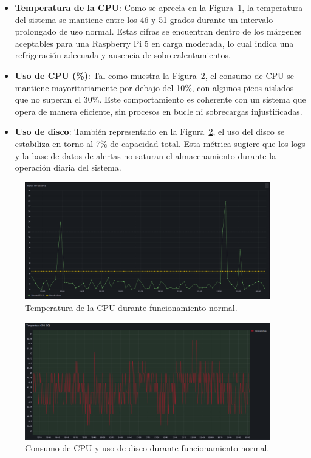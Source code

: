 \documentclass[11pt,a4paper,twoside]{report}
\begin{document}
\begin{itemize}
	\item \textbf{Temperatura de la CPU}: Como se aprecia en la Figura~\ref{fig:temp-normal}, la temperatura del sistema se mantiene entre los 46 y 51 grados durante un intervalo prolongado de uso normal. Estas cifras se encuentran dentro de los márgenes aceptables para una Raspberry Pi 5 en carga moderada, lo cual indica una refrigeración adecuada y ausencia de sobrecalentamientos.
	
	\item \textbf{Uso de CPU (\%)}: Tal como muestra la Figura~\ref{fig:cpu-normal}, el consumo de CPU se mantiene mayoritariamente por debajo del 10\%, con algunos picos aislados que no superan el 30\%. Este comportamiento es coherente con un sistema que opera de manera eficiente, sin procesos en bucle ni sobrecargas injustificadas.
	
	\item \textbf{Uso de disco}: También representado en la Figura~\ref{fig:cpu-normal}, el uso del disco se estabiliza en torno al 7\% de capacidad total. Esta métrica sugiere que los logs y la base de datos de alertas no saturan el almacenamiento durante la operación diaria del sistema.
\end{itemize}

\begin{figure}[H]
	\centering
	\includegraphics[width=0.95\textwidth]{benchmark/1.png}
	\caption{Temperatura de la CPU durante funcionamiento normal.}
	\label{fig:temp-normal}
\end{figure}

\begin{figure}[H]
	\centering
	\includegraphics[width=0.95\textwidth]{benchmark/2.png}
	\caption{Consumo de CPU y uso de disco durante funcionamiento normal.}
	\label{fig:cpu-normal}
\end{figure}
\end{document}
